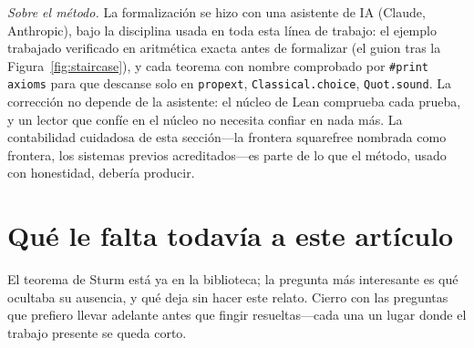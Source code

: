 \documentclass[11pt]{article}
\newcommand{\lean}[1]{\texttt{#1}}
\begin{document}
\emph{Sobre el m\'etodo.} La formalizaci\'on se hizo con una asistente de IA (Claude, Anthropic), bajo
la disciplina usada en toda esta l\'inea de trabajo: el ejemplo trabajado verificado en aritm\'etica
exacta antes de formalizar (el guion tras la Figura~\ref{fig:staircase}), y cada teorema con nombre
comprobado por \lean{\#print axioms} para que descanse solo en \lean{propext}, \lean{Classical.choice},
\lean{Quot.sound}. La correcci\'on no depende de la asistente: el n\'ucleo de Lean comprueba cada
prueba, y un lector que conf\'ie en el n\'ucleo no necesita confiar en nada m\'as. La contabilidad
cuidadosa de esta secci\'on---la frontera squarefree nombrada como frontera, los sistemas previos
acreditados---es parte de lo que el m\'etodo, usado con honestidad, deber\'ia producir.

\section{Qu\'e le falta todav\'ia a este art\'iculo}\label{sec:questions}

El teorema de Sturm est\'a ya en la biblioteca; la pregunta m\'as interesante es qu\'e ocultaba su
ausencia, y qu\'e deja sin hacer este relato. Cierro con las preguntas que prefiero llevar adelante
antes que fingir resueltas---cada una un lugar donde el trabajo presente se queda corto.
\end{document}
